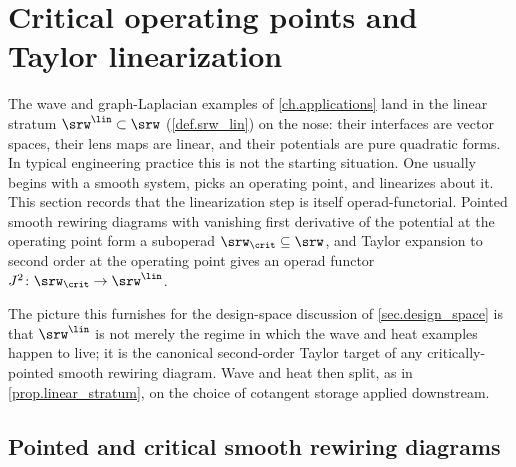 %
%

\section{Critical operating points and Taylor linearization}\label{sec.critical_linearization}

The wave and graph-Laplacian examples of \cref{ch.applications} land in the linear stratum $\srw^{\lin}\subset\srw$ (\cref{def.srw_lin}) on the nose: their interfaces are vector spaces, their lens maps are linear, and their potentials are pure quadratic forms. In typical engineering practice this is not the starting situation. One usually begins with a smooth system, picks an operating point, and linearizes about it. This section records that the linearization step is itself operad-functorial. Pointed smooth rewiring diagrams with vanishing first derivative of the potential at the operating point form a suboperad $\srw_{\crit}\subseteq\srw$, and Taylor expansion to second order at the operating point gives an operad functor $J^2\colon\srw_{\crit}\to\srw^{\lin}$.

The picture this furnishes for the design-space discussion of \cref{sec.design_space} is that $\srw^{\lin}$ is not merely the regime in which the wave and heat examples happen to live; it is the canonical second-order Taylor target of any critically-pointed smooth rewiring diagram. Wave and heat then split, as in \cref{prop.linear_stratum}, on the choice of cotangent storage applied downstream.

\subsection{Pointed and critical smooth rewiring diagrams}\label{sec.srw_pointed}

